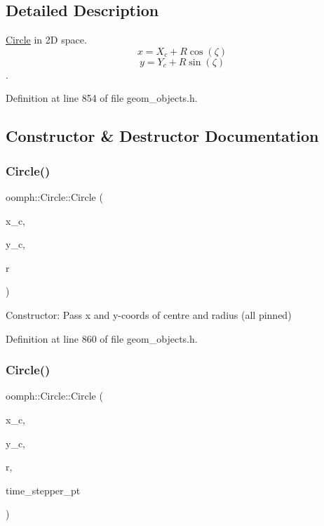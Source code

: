 \subsection{Detailed Description}
\hyperlink{classoomph_1_1Circle}{Circle} in 2D space. \[ x = X_c + R \cos(\zeta) \] \[ y = Y_c + R \sin(\zeta) \]. 

Definition at line 854 of file geom\+\_\+objects.\+h.



\subsection{Constructor \& Destructor Documentation}
\mbox{\label{classoomph_1_1Circle_ac15caf288929071b5561309771e4e0f0}} 
\subsubsection{\texorpdfstring{Circle()}{Circle()}\hspace{0.1cm}{\footnotesize\ttfamily [1/4]}}
{\footnotesize\ttfamily oomph\+::\+Circle\+::\+Circle (\begin{DoxyParamCaption}\item[{const double \&}]{x\+\_\+c,  }\item[{const double \&}]{y\+\_\+c,  }\item[{const double \&}]{r }\end{DoxyParamCaption})\hspace{0.3cm}{\ttfamily [inline]}}



Constructor\+: Pass x and y-\/coords of centre and radius (all pinned) 



Definition at line 860 of file geom\+\_\+objects.\+h.

\mbox{\label{classoomph_1_1Circle_a46c490c634039dc63c7eea5927b77c1c}} 
\subsubsection{\texorpdfstring{Circle()}{Circle()}\hspace{0.1cm}{\footnotesize\ttfamily [2/4]}}
{\footnotesize\ttfamily oomph\+::\+Circle\+::\+Circle (\begin{DoxyParamCaption}\item[{const double \&}]{x\+\_\+c,  }\item[{const double \&}]{y\+\_\+c,  }\item[{const double \&}]{r,  }\item[{\hyperlink{classoomph_1_1TimeStepper}{Time\+Stepper} $\ast$}]{time\+\_\+stepper\+\_\+pt }\end{DoxyParamCaption})\hspace{0.3cm}{\ttfamily [inline]}}



